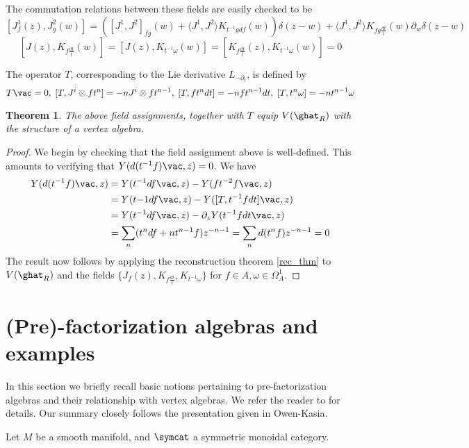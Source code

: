 \documentclass[12pt]{amsart}
\newtheorem{theorem}{Theorem}[section]
\theoremstyle{definition}
\theoremstyle{remark}
\newcommand{\R}{R}
\begin{document}
The commutation relations between these fields are easily checked to be
$$
[J^1_f (z), J^2_g (w)] = \left( [J^1, J^2]_{fg} (w) + \langle J^1, J^2 \rangle  K_{t^{-1} g df} (w)      \right) \delta(z-w) + \langle J^1, J^2 \rangle K_{fg \frac{dt}{t}} (w) \partial_w \delta(z-w)
$$
$$
[J(z), K_{f \frac{dt}{t}}(w) ] = [J(z), K_{t^{-1} \omega} (w)] = [ K_{f \frac{dt}{t}}(z),  K_{t^{-1} \omega} (w)] =0
$$

The operator $T$, corresponding to the Lie derivative $L_{-\partial_t}$, is defined by
\[
T \vac =0, \; [T, J^i \otimes f t^n] = -n J^i \otimes f t^{n-1}, \; [T, f t^n dt] = -n f t^{n-1} dt, \; [T, t^n \omega] = -n t^{n-1} \omega
\]

\begin{theorem}
The above field assignments, together with $T$ equip $V(\ghat_{\R})$ with the structure of a vertex algebra.
\end{theorem}

\begin{proof}
We begin by checking that the field assignment above is well-defined. This amounts to verifying that $Y(d(t^{-1}f)\vac,z ) =0$.  We have 
\begin{align*}
Y(d(t^{-1}f) \vac, z) &= Y(t^{-1} df \vac, z) - Y(f t^{-2} f \vac, z) \\
&= Y(t{-1} df \vac, z) - Y([T, t^{-1}f dt  ] \vac, z) \\
&= Y(t^{-1} df \vac, z) - \partial_z Y( t^{-1} f dt \vac, z) \\
&= \sum_{n} (t^n df + n t^{n-1} f) z^{-n-1} = \sum_{n} d(t^n f) z^{-n-1} = 0
\end{align*}
The result now follows by applying the reconstruction theorem \ref{rec_thm} to $V(\ghat_\R)$ and the fields $\{ J_f (z), K_{f \frac{dt}{t}}, K_{t^{-1} \omega} \}$ for $f \in A, \omega \in \Omega^{1}_A $.
\end{proof}

\section{(Pre)-factorization algebras and examples}

In this section we briefly recall basic notions pertaining to pre-factorization algebras and their relationship with vertex algebras. We refer the reader to \cite{CG} for details. Our summary closely follows the presentation given in \cite{} {\color{red} Owen-Kasia}. 

Let $M$ be a smooth manifold, and $\symcat$ a symmetric monoidal category. 
\end{document}
